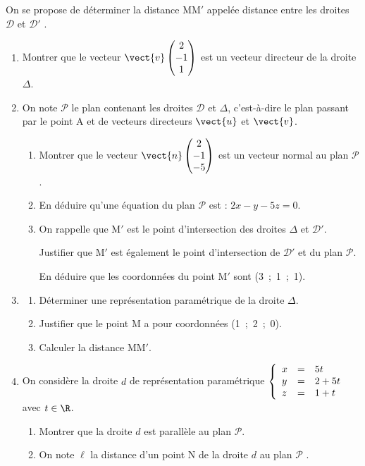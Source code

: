 On se propose de déterminer la distance MM$'$ appelée \og distance entre les droites $\mathcal{D}$ et $\mathcal{D}'$ \fg.
\begin{enumerate}[resume]
\item Montrer que le vecteur $\vect{v}\begin{pmatrix}2\\- 1\\1\end{pmatrix}$ est un vecteur directeur de la droite $\Delta$.
\item On note $\mathcal{P}$ le plan contenant les droites $\mathcal{D}$ et $\Delta$, c'est-à-dire le plan passant par le point A et de vecteurs directeurs $\vect{u}$ et $\vect{v}$.
	\begin{enumerate}
		\item Montrer que le vecteur $\vect{n}\begin{pmatrix}2\\-1\\-5 \end{pmatrix}$ est un vecteur normal au plan $\mathcal{P}$.
		\item En déduire qu'une équation du plan $\mathcal{P}$ est : $2x - y - 5z = 0$.
		\item On rappelle que M$'$ est le point d'intersection des droites $\Delta$ et $\mathcal{D}'$.
		
Justifier que M$'$ est également le point d'intersection de $\mathcal{D}'$ et du plan $\mathcal{P}$.
		
En déduire que les coordonnées du point M$'$ sont (3~;~1~;~1).
	\end{enumerate}
\item 
	\begin{enumerate}
		\item Déterminer une représentation paramétrique de la droite $\Delta$.
		\item Justifier que le point M a pour coordonnées (1~;~2~;~0).
		\item Calculer la distance MM$'$.
	\end{enumerate}
\item On considère la droite $d$ de représentation paramétrique $\left\{\begin{array}{l c l}
x &=& 5t\\y &=& 2 + 5t \\z&=&1 + t\end{array}\right.$ avec $t \in \R$.
	\begin{enumerate}
		\item Montrer que la droite $d$ est parallèle au plan $\mathcal{P}$.
		\item On note $\ell$ la distance d'un point N de la droite $d$ au plan $\mathcal{P}$ . 
		

\end{enumerate}
\end{enumerate}
